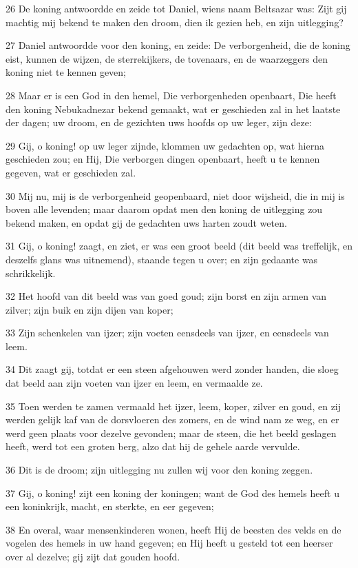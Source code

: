 \par 26 De koning antwoordde en zeide tot Daniel, wiens naam Beltsazar was: Zijt gij machtig mij bekend te maken den droom, dien ik gezien heb, en zijn uitlegging?
\par 27 Daniel antwoordde voor den koning, en zeide: De verborgenheid, die de koning eist, kunnen de wijzen, de sterrekijkers, de tovenaars, en de waarzeggers den koning niet te kennen geven;
\par 28 Maar er is een God in den hemel, Die verborgenheden openbaart, Die heeft den koning Nebukadnezar bekend gemaakt, wat er geschieden zal in het laatste der dagen; uw droom, en de gezichten uws hoofds op uw leger, zijn deze:
\par 29 Gij, o koning! op uw leger zijnde, klommen uw gedachten op, wat hierna geschieden zou; en Hij, Die verborgen dingen openbaart, heeft u te kennen gegeven, wat er geschieden zal.
\par 30 Mij nu, mij is de verborgenheid geopenbaard, niet door wijsheid, die in mij is boven alle levenden; maar daarom opdat men den koning de uitlegging zou bekend maken, en opdat gij de gedachten uws harten zoudt weten.
\par 31 Gij, o koning! zaagt, en ziet, er was een groot beeld (dit beeld was treffelijk, en deszelfs glans was uitnemend), staande tegen u over; en zijn gedaante was schrikkelijk.
\par 32 Het hoofd van dit beeld was van goed goud; zijn borst en zijn armen van zilver; zijn buik en zijn dijen van koper;
\par 33 Zijn schenkelen van ijzer; zijn voeten eensdeels van ijzer, en eensdeels van leem.
\par 34 Dit zaagt gij, totdat er een steen afgehouwen werd zonder handen, die sloeg dat beeld aan zijn voeten van ijzer en leem, en vermaalde ze.
\par 35 Toen werden te zamen vermaald het ijzer, leem, koper, zilver en goud, en zij werden gelijk kaf van de dorsvloeren des zomers, en de wind nam ze weg, en er werd geen plaats voor dezelve gevonden; maar de steen, die het beeld geslagen heeft, werd tot een groten berg, alzo dat hij de gehele aarde vervulde.
\par 36 Dit is de droom; zijn uitlegging nu zullen wij voor den koning zeggen.
\par 37 Gij, o koning! zijt een koning der koningen; want de God des hemels heeft u een koninkrijk, macht, en sterkte, en eer gegeven;
\par 38 En overal, waar mensenkinderen wonen, heeft Hij de beesten des velds en de vogelen des hemels in uw hand gegeven; en Hij heeft u gesteld tot een heerser over al dezelve; gij zijt dat gouden hoofd.
